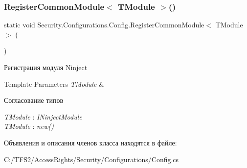 \subsubsection{\texorpdfstring{Register\+Common\+Module$<$ T\+Module $>$()}{RegisterCommonModule< TModule >()}}
{\footnotesize\ttfamily static void Security.\+Configurations.\+Config.\+Register\+Common\+Module$<$ T\+Module $>$ (\begin{DoxyParamCaption}{ }\end{DoxyParamCaption})\hspace{0.3cm}{\ttfamily [static]}}



Регистрация модуля Ninject 


\begin{DoxyTemplParams}{Template Parameters}
{\em T\+Module} & \\
\hline
\end{DoxyTemplParams}
\begin{Desc}
\item[Согласование типов]\begin{description}
\item[{\em T\+Module} : {\em I\+Ninject\+Module}]\item[{\em T\+Module} : {\em new()}]\end{description}
\end{Desc}


Объявления и описания членов класса находятся в файле\+:\begin{DoxyCompactItemize}
\item 
C\+:/\+T\+F\+S2/\+Access\+Rights/\+Security/\+Configurations/Config.\+cs\end{DoxyCompactItemize}
